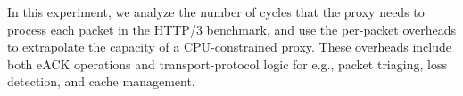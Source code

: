 



In this experiment, we analyze the number of cycles that the proxy
needs to process each
packet in the HTTP/3 benchmark, and use the per-packet overheads to
extrapolate the capacity of a CPU-constrained proxy. These overheads
include both eACK operations and transport-protocol logic for e.g.,
packet triaging, loss detection, and cache management.


